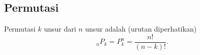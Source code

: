 \subsection{Permutasi}
Permutasi $k$ unsur dari $n$ unsur adalah (urutan diperhatikan)
$$_nP_k = P_k^n = \dfrac{n!}{(n-k)!}.$$
